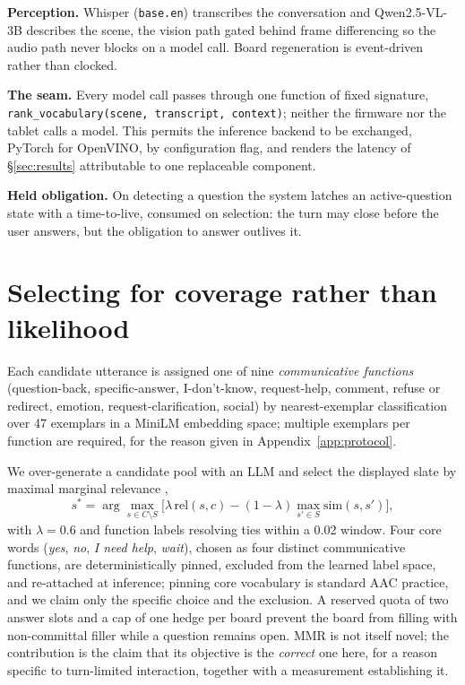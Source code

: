 \textbf{Perception.} Whisper (\texttt{base.en}) transcribes the conversation and
Qwen2.5-VL-3B \citep{qwen25vl} describes the scene, the vision path gated behind
frame differencing so the audio path never blocks on a model call. Board
regeneration is event-driven rather than clocked.

\textbf{The seam.} Every model call passes through one function of fixed
signature, \texttt{rank\_vocabulary(scene, transcript, context)}; neither the
firmware nor the tablet calls a model. This permits the inference backend to be
exchanged, PyTorch for OpenVINO, by configuration flag, and renders the latency
of \S\ref{sec:results} attributable to one replaceable component.

\textbf{Held obligation.} On detecting a question the system latches an
active-question state with a time-to-live, consumed on selection: the turn may
close before the user answers, but the obligation to answer outlives it.

\section{Selecting for coverage rather than likelihood}

Each candidate utterance is assigned one of nine \emph{communicative functions}
(question-back, specific-answer, I-don't-know, request-help, comment, refuse or
redirect, emotion, request-clarification, social) by nearest-exemplar
classification over 47 exemplars in a MiniLM \citep{minilm} embedding space;
multiple exemplars per function are required, for the reason given in
Appendix~\ref{app:protocol}.

We over-generate a candidate pool with an LLM and select the displayed slate by
maximal marginal relevance \citep{mmr1998},
\begin{equation}
s^{*} = \arg\max_{s \in C \setminus S}
\Big[\lambda\,\mathrm{rel}(s, c) - (1-\lambda)\max_{s' \in S}\mathrm{sim}(s, s')\Big],
\end{equation}
with $\lambda = 0.6$ and function labels resolving ties within a 0.02 window.
Four core words (\emph{yes}, \emph{no}, \emph{I need help}, \emph{wait}), chosen
as four distinct communicative functions, are deterministically pinned, excluded
from the learned label space, and re-attached at inference; pinning core
vocabulary is standard AAC practice, and we claim only the specific choice and
the exclusion. A reserved quota of two answer slots and a cap of one hedge per
board prevent the board from filling with non-committal filler while a question
remains open. MMR is not itself novel; the contribution is the claim that its
objective is the \emph{correct} one here, for a reason specific to turn-limited
interaction, together with a measurement establishing it.

